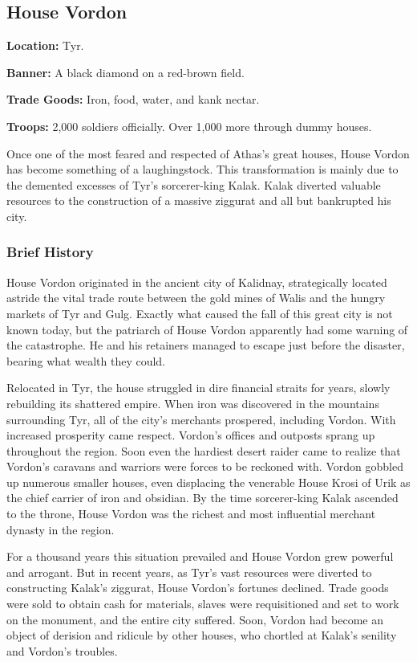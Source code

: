 \subsection{House Vordon}
\textbf{Location:} Tyr.

\textbf{Banner:} A black diamond on a red-brown field.

\textbf{Trade Goods:} Iron, food, water, and kank nectar.

\textbf{Troops:} 2,000 soldiers officially. Over 1,000 more through dummy houses.

Once one of the most feared and respected of Athas's great houses, House Vordon has become something of a laughingstock. This transformation is mainly due to the demented excesses of Tyr's sorcerer-king Kalak. Kalak diverted valuable resources to the construction of a massive ziggurat and all but bankrupted his city.

\subsubsection{Brief History}
House Vordon originated in the ancient city of Kalidnay, strategically located astride the vital trade route between the gold mines of Walis and the hungry markets of Tyr and Gulg. Exactly what caused the fall of this great city is not known today, but the patriarch of House Vordon apparently had some warning of the catastrophe. He and his retainers managed to escape just before the disaster, bearing what wealth they could.

Relocated in Tyr, the house struggled in dire financial straits for years, slowly rebuilding its shattered empire. When iron was discovered in the mountains surrounding Tyr, all of the city's merchants prospered, including Vordon. With increased prosperity came respect. Vordon's offices and outposts sprang up throughout the region. Soon even the hardiest desert raider came to realize that Vordon's caravans and warriors were forces to be reckoned with. Vordon gobbled up numerous smaller houses, even displacing the venerable House Krosi of Urik as the chief carrier of iron and obsidian. By the time sorcerer-king Kalak ascended to the throne, House Vordon was the richest and most influential merchant dynasty in the region.

For a thousand years this situation prevailed and House Vordon grew powerful and arrogant. But in recent years, as Tyr's vast resources were diverted to constructing Kalak's ziggurat, House Vordon's fortunes declined. Trade goods were sold to obtain cash for materials, slaves were requisitioned and set to work on the monument, and the entire city suffered. Soon, Vordon had become an object of derision and ridicule by other houses, who chortled at Kalak's senility and Vordon's troubles.


